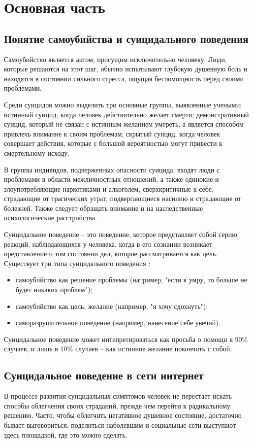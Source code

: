 \section{Основная часть}

\subsection{Понятие самоубийства и суицидального поведения}
Самоубийство является актом, присущим исключительно человеку. Люди, которые решаются на этот шаг, обычно испытывают глубокую душевную боль и находятся в состоянии сильного стресса, ощущая беспомощность перед своими проблемами. \cite{alimobSuicide}

Среди суицидов можно выделить три основные группы, выявленные учеными: истинный суицид, когда человек действительно желает смерти; демонстративный суицид, который не связан с истинным желанием умереть, а является способом привлечь внимание к своим проблемам; скрытый суицид, когда человек совершает действия, которые с большой вероятностью могут привести к смертельному исходу. \cite{alimobSuicide}

В группы индивидов, подверженных опасности суицида, входят люди с проблемами в области межличностных отношений, а также одинокие и злоупотребляющие наркотиками и алкоголем, сверхкритичные к себе, страдающие от трагических утрат, подвергающиеся насилию и страдающие от болезней. Также следует обращать внимание и на наследственные психологические расстройства.

Суицидальное поведение -- это поведение, которое представляет собой серию реакций, наблюдающихся у человека, когда в его сознании возникает представление о том состоянии дел, которое рассматривается как цель. Существует три типа суицидального поведения \cite{Kasyanov}:
\begin{itemize}
\item самоубийство как решение проблемы (например, "если я умру, то больше не будет никаких проблем");
\item самоубийство как цель, желание (например, "я хочу сдохнуть");
\item саморазрушительное поведение (например, нанесение себе увечий).
\end{itemize}

Суицидальное поведение может интепретироваться как просьба о помощи в 90\% случаев, и лишь в 10\% случаев -- как истинное желание покончить с собой. \cite{Kasyanov}

\subsection{Суицидальное поведение в сети интернет}
В процессе развития суицидальных симптомов человек не перестает искать способы облегчения своих страданий, прежде чем перейти к радикальному решению. Часто, чтобы облегчить негативное душевное состояние, достаточно бывает выговориться, поделиться наболевшим и социальные сети выступают здесь площадкой, где это можно сделать.

